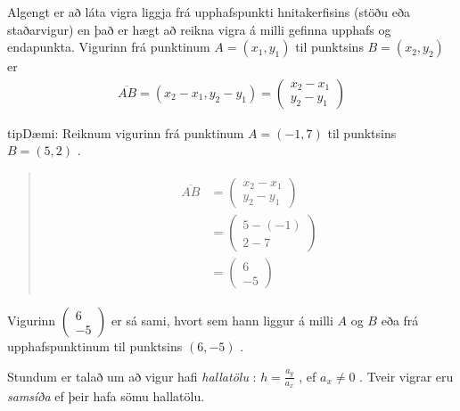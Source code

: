 \documentclass[a4paper,10pt,icelandic]{sphinxmanual}
\begin{document}
Algengt er að láta vigra liggja frá upphafspunkti hnitakerfisins (stöðu\sphinxhyphen{} eða staðarvigur) en það er hægt að reikna vigra á milli gefinna upphafs\sphinxhyphen{} og endapunkta.
Vigurinn frá punktinum \(A=(x_1,y_1)\) til punktsins \(B=(x_2,y_2)\) er
\begin{equation*}
\begin{split}\overline{AB} = (x_2-x_1,y_2-y_1) = \begin{pmatrix} x_2-x_1 \\ y_2-y_1 \end{pmatrix}\end{split}
\end{equation*}
\begin{sphinxadmonition}{tip}{Dæmi:}
Reiknum vigurinn frá punktinum \(A=(-1,7)\) til punktsins \(B=(5,2)\) .
\begin{quote}
\begin{equation*}
\begin{split}\begin{aligned}
        \overline{AB} &= \begin{pmatrix} x_2-x_1 \\ y_2-y_1 \end{pmatrix}\\
        &= \begin{pmatrix} 5-(-1) \\ 2-7 \end{pmatrix} \\
        &= \begin{pmatrix} 6 \\ -5 \end{pmatrix}
\end{aligned}\end{split}
\end{equation*}
\begin{figure}[H]
\centering

\noindent{}
\end{figure}
\end{quote}

Vigurinn \(\begin{pmatrix} 6 \\ -5 \end{pmatrix}\) er sá sami, hvort sem hann liggur á milli \(A\) og \(B\) eða frá upphafspunktinum til punktsins \((6,-5)\) .
\end{sphinxadmonition}

Stundum er talað um að vigur hafi \textit{hallatölu} : \(h=\frac{a_y}{a_x}\) , ef \(a_x\neq 0\) .
Tveir vigrar eru \textit{samsíða} ef þeir hafa sömu hallatölu.
\end{document}
